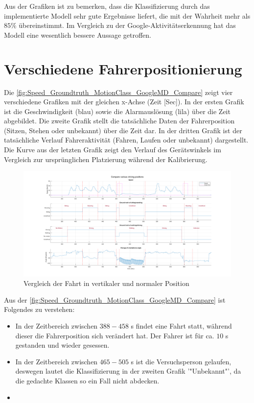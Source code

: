 Aus der Grafiken ist zu bemerken, dass die Klassifizierung durch das implementierte Modell sehr gute Ergebnisse liefert, die mit der Wahrheit mehr als $85\%$ übereinstimmt. Im Vergleich zu der Google-Aktivitätserkennung hat das Modell eine wesentlich bessere Aussage getroffen.



\section{Verschiedene Fahrerpositionierung}
Die \autoref{fig:Speed_Groundtruth_MotionClass_GoogleMD_Compare} zeigt vier verschiedene Grafiken mit der gleichen x-Achse (Zeit [Sec]).
In der ersten Grafik ist die Geschwindigkeit (blau) sowie die Alarmauslösung (lila) über die Zeit abgebildet.
Die zweite Grafik stellt die tatsächliche Daten der Fahrerposition (Sitzen, Stehen oder unbekannt) über die Zeit dar.
In der dritten Grafik ist der tatsächliche Verlauf Fahreraktivität (Fahren, Laufen oder unbekannt) dargestellt.
Die Kurve aus der letzten Grafik zeigt den Verlauf des Gerätswinkels im Vergleich zur ursprünglichen Platzierung während der Kalibrierung. 

\begin{figure}[H]
	\centering
	\includegraphics[width=\linewidth]{Bilder/Speed_Groundtruth_WalkStand_Compare.png}
	\caption{Vergleich der Fahrt in vertikaler und normaler Position} %
	\label{fig:Speed_Groundtruth_WalkStand_Compare}
\end{figure}


Aus der \autoref{fig:Speed_Groundtruth_MotionClass_GoogleMD_Compare} ist Folgendes zu verstehen:

\begin{itemize}
	\item In der Zeitbereich zwischen $388 - 458$ s findet eine Fahrt statt, während dieser die Fahrerposition sich verändert hat. Der Fahrer ist für ca. $10$ s gestanden und wieder gesessen.
	\item In der Zeitbereich zwischen $465 - 505$ s ist die Versuchsperson gelaufen, deswegen lautet die Klassifizierung in der zweiten Grafik '"Unbekannt"', da die gedachte Klassen so ein Fall nicht abdecken.
	\item  
\end{itemize}

